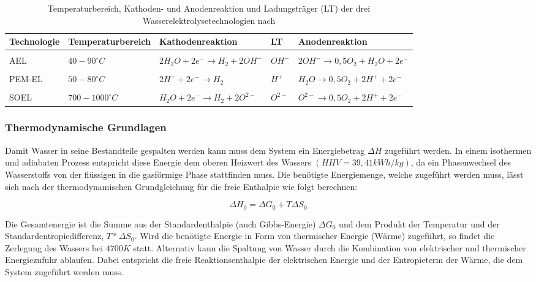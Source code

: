 \documentclass[onecolumn,10pt,titlepage]{article}
\begin{document}
\begin{table}[H]

	\label{tab:Tempber+Reakt}
	\caption{Temperaturbereich, Kathoden- und Anodenreaktion und Ladungsträger (LT) der drei Wasserelektrolysetechnologien nach \cite{Lindermeir.7.11.2017}}

	\begin{tabular*}{\textwidth}{lllll}

		\textbf{Technologie} & \textbf{Temperaturbereich} & \textbf{Kathodenreaktion} & \textbf{LT} & \textbf{Anodenreaktion} \\ \hline \hline
		&&&&\\
		AEL&$40-90 ^\circ{C} $&$ 2H_2O + 2e^- \rightarrow H_2 + 2OH^- $&$OH^-$&$2OH^- \rightarrow 0,5O_2 + H_2O + 2e^- $\\
		&&&&\\
		PEM-EL&$50-80 ^\circ{C} $&$ 2H^+ + 2e^- \rightarrow H_2$&$ H^+ $&$ H_2O \rightarrow 0,5O_2 + 2H^+ +2e^- $\\
		&&&&\\
		SOEL&$700-1000 ^\circ{C} $&$ H_2O + 2e^- \rightarrow H_2 + 2O^{2-}$&$ O^{2-} $&$ O^{2-} \rightarrow 0,5O_2 + 2H^+ + 2e^-$\\

	\end{tabular*}

\end{table}

\subsubsection{Thermodynamische Grundlagen}
\label{subsub_thermodynGrundL}
Damit Wasser in seine Bestandteile gespalten werden kann muss dem System ein Energiebetrag $\Delta H$ zugeführt werden.\cite{Jung} In einem isothermen und adiabaten Prozess entspricht diese Energie dem oberen Heizwert des Wassers $(HHV=39,41kWh/kg)$, da ein Phasenwechsel des Wasserstoffs von der flüssigen in die gasförmige Phase stattfinden muss. Die benötigte Energiemenge, welche zugeführt werden muss, lässt sich nach der thermodynamischen Grundgleichung für die freie Enthalpie wie folgt berechnen:

\begin{equation}
\Delta H_0 = \Delta G_0 + T\Delta S_0
\end{equation}

Die Gesamtenergie ist die Summe aus der Standardenthalpie (auch Gibbs-Energie) $\Delta G_0$ und dem Produkt der Temperatur und der Standardentropiedifferenz, $T * \Delta S_0$. Wird die benötigte Energie in Form von thermischer Energie (Wärme) zugeführt, so findet die Zerlegung des Wassers bei $4700K$ statt. Alternativ kann die Spaltung von Wasser durch die Kombination von elektrischer und thermischer Energiezufuhr ablaufen. Dabei entspricht die freie Reaktionsenthalpie der elektrischen Energie und der Entropieterm der Wärme, die dem System zugeführt werden muss.\\
\end{document}
